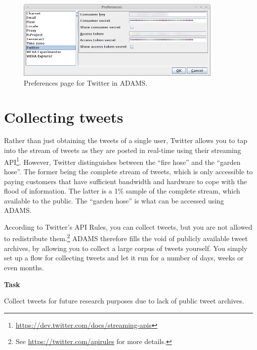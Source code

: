 \documentclass[a4paper,10pt]{book}
\newcommand{\heading}[1]{
  \vspace{0.3cm} \noindent \textbf{#1} \newline
}
\begin{document}
\begin{figure}[htb]
  \centering
  \includegraphics[width=10.0cm]{images/twitter_preferences.png}
  \caption{Preferences page for Twitter in ADAMS.}
  \label{twitter_preferences}
\end{figure}

\clearpage
\newpage
\section{Collecting tweets}
Rather than just obtaining the tweets of a single user, Twitter allows you to tap into the stream of tweets as they are posted in real-time using their streaming API\footnote{\url{https://dev.twitter.com/docs/streaming-apis}{}}. However, Twitter distinguishes between the ``fire hose'' and the ``garden hose''. The former being the complete stream of tweets, which is only accessible to paying customers that have sufficient bandwidth and hardware to cope with the flood of information. The latter is a 1\% sample of the complete stream, which available to the public. The ``garden hose'' is what can be accessed using ADAMS.

According to Twitter's API Rules, you can collect tweets, but you are not allowed to redistribute them.\footnote{See \url{https://twitter.com/apirules}{} for more details.} ADAMS therefore fills the void of publicly available tweet archives, by allowing you to collect a large corpus of tweets yourself. You simply set up a flow for collecting tweets and let it run for a number of days, weeks or even months.

\heading{Task}
Collect tweets for future research purposes due to lack of public tweet archives.
\end{document}
